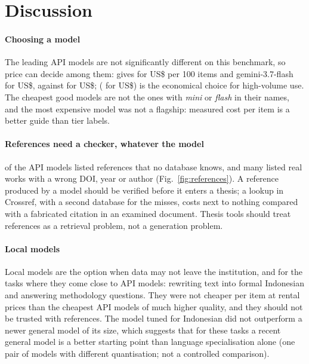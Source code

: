\section{Discussion}
\label{sec:discussion}

\paragraph{Choosing a model} The leading API models are not significantly different on this benchmark, so price can decide among them: \ThirdName{} gives \ScoreGptSixOneSol{} for US\$\ThirdUSD{} per 100 items and gemini-3.7-flash \ScoreGeminiThreeSevenFlash{} for US\$\UsdGeminiThreeSevenFlash{}, against \TopScore{} for US\$\TopUSD{}; \CheapName{} (\CheapScore{} for US\$\CheapUSD{}) is the economical choice for high-volume use. The cheapest good models are not the ones with \emph{mini} or \emph{flash} in their names, and the most expensive model was not a flagship: measured cost per item is a better guide than tier labels.

\paragraph{References need a checker, whatever the model} \NoneApiNonzero{} of the \NApi{} API models listed references that no database knows, and many listed real works with a wrong DOI, year or author (Fig.~\ref{fig:references}). A reference produced by a model should be verified before it enters a thesis; a lookup in Crossref, with a second database for the misses, costs next to nothing compared with a fabricated citation in an examined document. Thesis tools should treat references as a retrieval problem, not a generation problem.

\paragraph{Local models} Local models are the option when data may not leave the institution, and for the tasks where they come close to API models: rewriting text into formal Indonesian and answering methodology questions. They were not cheaper per item at rental prices than the cheapest API models of much higher quality, and they should not be trusted with references. The model tuned for Indonesian did not outperform a newer general model of its size, which suggests that for these tasks a recent general model is a better starting point than language specialisation alone (one pair of models with different quantisation; not a controlled comparison).

